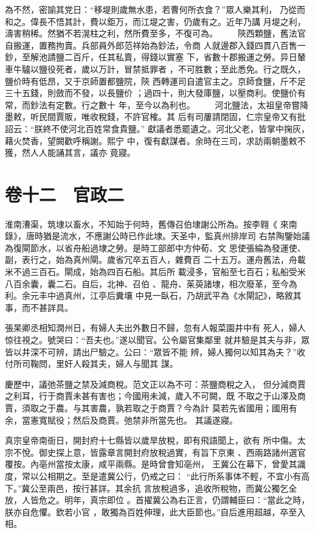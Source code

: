 \documentclass{ctexart}
\begin{document}
為不然，密諭其党日：``移堤則歲無水患，若曹何所衣食？''眾人樂其利， 乃從而和之。偉長不悟其計，費以鉅万，而江堤之害，仍歲有之。近年乃講 月堤之利，濤害稍稀。然猶不若滉柱之利，然所費至多，不復可為。 　　陝西顆鹽，舊法官自搬運，置務拘賣。兵部員外郎范祥始為鈔法，令商 人就邊郡入錢四貫八百售一鈔，至解池請鹽二百斤，任其私賣，得錢以實塞 下，省數十郡搬運之勞。异日輦車牛驢以鹽役死者，歲以万計，冒禁抵罪者 ，不可胜數；至此悉免。行之既久，鹽价時有低昂，又于京師置都鹽院，陝 西轉運司自遣官主之。京師食鹽，斤不足三十五錢，則斂而不發，以長鹽价 ；過四十，則大發庫鹽，以壓商利。使鹽价有常，而鈔法有定數。行之數十 年，至今以為利也。 　　河北鹽法，太祖皇帝嘗降墨敕，听民間賈販，唯收稅錢，不許官榷。其 后有司屢請閉固，仁宗皇帝又有批詔云：``朕終不使河北百姓常食貴鹽。'' 獻議者悉罷遺之。河北父老，皆掌中掬灰，藉火焚香，望闕歡呼稱謝。熙宁 中，復有獻謀者。余時在三司，求訪兩朝墨敕不獲，然人人能誦其言，議亦 竟寢。
\clearpage
\section{卷十二　官政二}
\paragraph{}
淮南漕渠，筑埭以畜水，不知始于何時，舊傳召伯埭謝公所為。按李翱《 來南錄》，唐時猶是流水，不應謝公時已作此埭。天圣中，監真州排岸司 右禁陶鑒始議為復閘節水，以省舟船過埭之勞。是時工部郎中方仲荀、文 思使張綸為發運使、副，表行之，始為真州閘。歲省冗卒五百人，雜費百 二十五万。運舟舊法，舟載米不過三百石。閘成，始為四百石船。其后所 載浸多，官船至七百石；私船受米八百余囊，囊二石。自后，北神、召伯 、龍舟、茱萸諸埭，相次廢革，至今為利。余元丰中過真州，江亭后糞壤 中見一臥石，乃胡武平為《水閘記》，略敘其事，而不甚詳具。

張杲卿丞相知潤州日，有婦人夫出外數日不歸，忽有人報菜園井中有 死人，婦人惊往視之。號哭曰：``吾夫也。''遂以聞官。公令屬官集鄰里 就井驗是其夫与非，眾皆以井深不可辨，請出尸驗之。公曰：``眾皆不能 辨，婦人獨何以知其為夫？''收付所司鞠問，里奸人殺其夫，婦人与聞其 謀。

慶歷中，議弛茶鹽之禁及減商稅。范文正以為不可：茶鹽商稅之入， 但分減商賈之利耳，行于商賈未甚有害也；今國用未減，歲入不可闕，既 不取之于山澤及商賈，須取之于農。与其害農，孰若取之于商賈？今為計 莫若先省國用；國用有余，當憲寬賦役；然后及商賈。弛禁非所當先也。 其議遂寢。

真宗皇帝南衙日，開封府十七縣皆以歲旱放稅，即有飛語聞上，欲有 所中傷。太宗不悅。御史探上意，皆露章言開封府放稅過實，有旨下京東 、西兩路諸州選官覆按。內亳州當按太康，咸平兩縣。是時曾會知亳州， 王冀公在幕下，曾愛其識度，常以公相期之。至是遣冀公行，仍戒之曰： ``此行所系事体不輕，不宜小有高下。''冀公至兩邑，按行甚詳。其余抗 言放稅過多，追收所稅物，而冀公獨乞全放，人皆危之。明年，真宗即位 。首擢冀公為右正言，仍謂輔臣曰：``當此之時，朕亦自危懼。欽若小官 ，敢獨為百姓伸理，此大臣節也。''自后進用超越，卒至入相。
\end{document}

